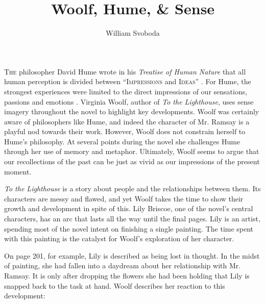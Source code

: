 %
%



\titlehead{Princeton University}
\title{Woolf, Hume, \& Sense}
\author{William Svoboda}
\subject{Ways of Knowing: Philosophy and Literature}
\date{}

%
%



\maketitle


\lettrine[lines=2, nindent=0pt, findent=0.25em, loversize=0.09]{T}{he} philosopher David Hume wrote in his \emph{Treatise of Human Nature} that all human perception is divided between \enquote{\textsc{Impressions} and \textsc{Ideas}} \autocite[1]{hume_78}. For Hume, the strongest experiences were limited to the direct impressions of our sensations, passions and emotions \autocite[1]{hume_78}. Virginia Woolf, author of \emph{To the Lighthouse}, uses sense imagery throughout the novel to highlight key developments. Woolf was certainly aware of philosophers like Hume, and indeed the character of Mr. Ramsay is a playful nod towards their work. However, Woolf does not constrain herself to Hume's philosophy. At several points during the novel she challenges Hume through her use of memory and metaphor. Ultimately, Woolf seems to argue that our recollections of the past can be just as vivid as our impressions of the present moment.

\emph{To the Lighthouse} is a story about people and the relationships between them. Its characters are messy and flawed, and yet Woolf takes the time to show their growth and development in spite of this. Lily Briscoe, one of the novel's central characters, has an arc that lasts all the way until the final pages. Lily is an artist, spending most of the novel intent on finishing a single painting. The time spent with this painting is the catalyst for Woolf's exploration of her character.

On page 201, for example, Lily is described as being lost in thought. In the midst of painting, she had fallen into a daydream about her relationship with Mr. Ramsay. It is only after dropping the flowers she had been holding that Lily is snapped back to the task at hand. Woolf describes her reaction to this development:

